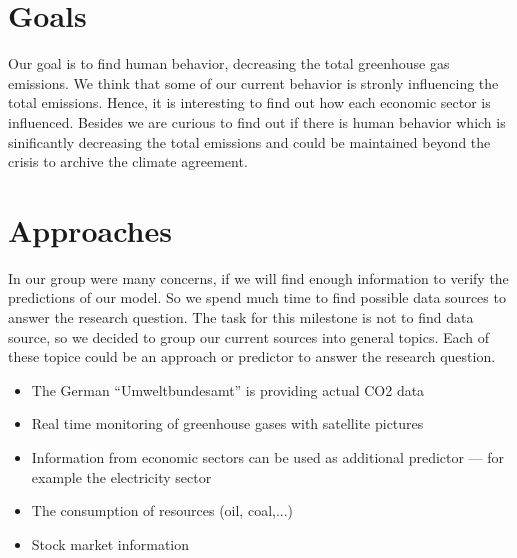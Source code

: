 \documentclass[lang=english,inputenc=utf8,fontsize=10pt]{ldvarticle}
\begin{document}
\section*{Goals}
Our goal is to find human behavior, decreasing the total greenhouse gas emissions. We think that some of our current behavior is stronly influencing the total emissions. Hence, it is interesting to find out how each economic sector is influenced. Besides we are curious to find out if there is human behavior which is sinificantly decreasing the total emissions and could be maintained beyond the crisis to archive the climate agreement.\\

\section*{Approaches}
In our group were many concerns, if we will find enough information to verify the predictions of our model. So we spend much time to find possible data sources to answer the research question. The task for this milestone is not to find data source, so we decided to group our current sources into general topics. Each of these topice could be an approach or predictor to answer the research question.\\

\begin{itemize}
    \item The German \enquote{Umweltbundesamt} is providing actual CO2 data
    \item Real time monitoring of greenhouse gases with satellite pictures
    \item Information from economic sectors can be used as additional predictor --- for example the electricity sector
    \item The consumption of resources (oil, coal,...)
    \item Stock market information
\end{itemize}

\newpage
\end{document}

